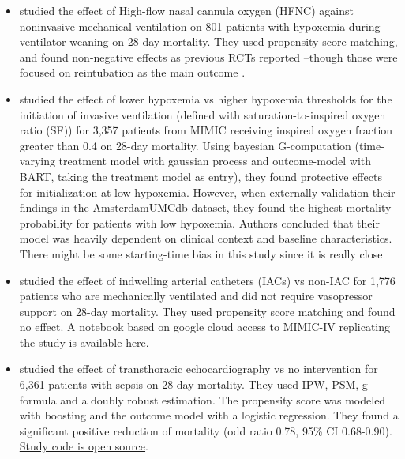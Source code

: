\documentclass[10pt,letterpaper]{article}
\begin{document}
\begin{itemize}[leftmargin=2ex]
  \item \cite{liu2021effects} studied the effect of \textcolor{I}{High-flow
          nasal cannula oxygen (HFNC)} against \textcolor{C}{noninvasive
          mechanical ventilation} on \textcolor{P}{801 patients with hypoxemia
          during ventilator weaning} on \textcolor{O}{28-day mortality}. They
        used propensity score matching, and found non-negative effects as
        previous RCTs reported --though those were focused on reintubation as the
        main outcome \cite{stephan2015high,hernandez2016effect}.

  \item \cite{yarnell2023oxygenation} studied the effect of \textcolor{I}{lower hypoxemia} vs \textcolor{C}{higher
        hypoxemia thresholds for the initiation of invasive ventilation} (defined with saturation-to-inspired oxygen ratio (SF)) for
        \textcolor{P}{3,357 patients from MIMIC receiving inspired oxygen fraction greater than 0.4} on \textcolor{O}{28-day
          mortality}. Using bayesian G-computation (time-varying treatment model with
        gaussian process and outcome-model with BART, taking the treatment model as
        entry), they found protective effects for initialization at low hypoxemia.
        However, when externally validation their findings in the AmsterdamUMCdb dataset,
        they found the highest mortality probability for patients with low hypoxemia.
        Authors concluded that their model was heavily dependent on clinical context
        and baseline characteristics. There might be some starting-time bias in this study since it is really close

  \item \cite{hsu2015association} studied the effect of \textcolor{I}{indwelling
          arterial catheters (IACs)} vs \textcolor{C}{non-IAC} for
        \textcolor{P}{1,776 patients who are mechanically ventilated and did
          not require vasopressor support} on \textcolor{O}{28-day mortality}.
        They used propensity score matching and found no effect. A notebook based on google cloud access to MIMIC-IV
        replicating the study is available \href{https://github.com/alistairewj/mimic-iv-aline-study/blob/main/mimic_iv_aline.ipynb}{here}.

  \item \cite{feng2018transthoracic} studied the effect of
        \textcolor{I}{transthoracic echocardiography} vs \textcolor{C}{no
          intervention} for \textcolor{P}{6,361 patients with sepsis} on
        \textcolor{O}{28-day mortality}. They used IPW, PSM, g-formula and a
        doubly robust estimation. The propensity score was modeled with boosting
        and the outcome model with a logistic regression. They
        found a significant positive reduction of mortality (odd ratio 0.78, 95\% CI 0.68-0.90).
        \href{https://github.com/nus-mornin-lab/echo-mimiciii}{Study code is
          open source}.


\end{itemize}
\end{document}
